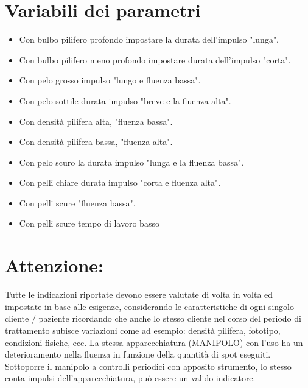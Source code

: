 \documentclass[10pt]{article}
\begin{document}
\section{Variabili dei parametri}
\begin{itemize}
  \item Con bulbo pilifero profondo impostare la durata dell'impulso "lunga".
  \item Con bulbo pilifero meno profondo impostare durata dell'impulso "corta".
  \item Con pelo grosso impulso "lungo e fluenza bassa".
  \item Con pelo sottile durata impulso "breve e la fluenza alta".
  \item Con densità pilifera alta, "fluenza bassa".
  \item Con densità pilifera bassa, "fluenza alta".
  \item Con pelo scuro la durata impulso "lunga e la fluenza bassa".
  \item Con pelli chiare durata impulso "corta e fluenza alta".
  \item Con pelli scure "fluenza bassa".
  \item Con pelli scure tempo di lavoro basso
\end{itemize}

\section{Attenzione:}
Tutte le indicazioni riportate devono essere valutate di volta in volta ed impostate in base alle esigenze, considerando le caratteristiche di ogni singolo cliente / paziente ricordando che anche lo stesso cliente nel corso del periodo di trattamento subisce variazioni come ad esempio: densità pilifera, fototipo, condizioni fisiche, ecc. La stessa apparecchiatura (MANIPOLO) con l'uso ha un deterioramento nella fluenza in funzione della quantità di spot eseguiti.\\
Sottoporre il manipolo a controlli periodici con apposito strumento, lo stesso conta impulsi dell’apparecchiatura, può essere un valido indicatore.
\end{document}
